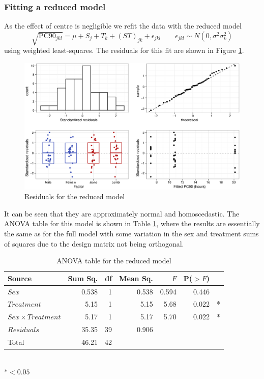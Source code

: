 \pagebreak
\subsubsection*{Fitting a reduced model}
As the effect of centre is negligible we refit the data with the reduced model
\begin{equation}
\sqrt{\mathrm{PC}90_{jkl}}=\mu+S_j+T_k+(ST)_{jk}+\epsilon_{jkl}\quad\quad\epsilon_{jkl}\sim N(0,\sigma^{2}\sigma_{k}^2)\label{reduced}
\end{equation}
using weighted least-squares. The residuals for this fit are shown in Figure \ref{aov2rwt}.
\begin{figure}[h]
\includegraphics[width=150mm]{aov2rwt.eps} 
\caption{Residuals for the reduced model}
\label{aov2rwt}
\end{figure}

It can be seen that they are approximately normal and homoscedastic. The ANOVA table for this model is shown in Table \ref{aovreduced}, where the results are essentially the same as for the full model with some variation in the sex and treatment sums of squares due to the design matrix not being orthogonal.
\begin{table}[h]
\centering
\caption{ANOVA table for the reduced model}\label{aovreduced}
\begin{tabular}{l|rrrrrl}
Source&Sum Sq.&df&Mean Sq.&$F$&P($>F$)\\
\hline
$Sex$				& 0.538 & 1 & 0.538 & 0.594 & 0.446 & \\
$Treatment$			& 5.15   & 1 & 5.15   & 5.68   & 0.022 & *\\
$Sex\times Treatment$	& 5.17   & 1 & 5.17   & 5.70   & 0.022 & *\\
$Residuals$			& 35.35 & 39 & 0.906 &&&\\
\hline
Total&46.21&42&&&
\end{tabular}\\
$*<0.05$
\end{table}

